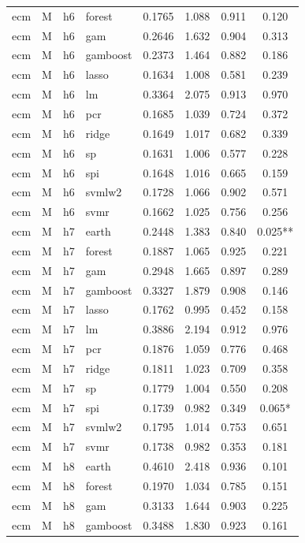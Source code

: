 \begin{ThreePartTable}
\begin{longtable}[t]{llclcccc}
ecm & M & h6 & forest & 0.1765 & 1.088 & 0.911 & 0.120\\
ecm & M & h6 & gam & 0.2646 & 1.632 & 0.904 & 0.313\\
ecm & M & h6 & gamboost & 0.2373 & 1.464 & 0.882 & 0.186\\
ecm & M & h6 & lasso & 0.1634 & 1.008 & 0.581 & 0.239\\
ecm & M & h6 & lm & 0.3364 & 2.075 & 0.913 & 0.970\\
ecm & M & h6 & pcr & 0.1685 & 1.039 & 0.724 & 0.372\\
ecm & M & h6 & ridge & 0.1649 & 1.017 & 0.682 & 0.339\\
ecm & M & h6 & sp & 0.1631 & 1.006 & 0.577 & 0.228\\
ecm & M & h6 & spi & 0.1648 & 1.016 & 0.665 & 0.159\\
ecm & M & h6 & svmlw2 & 0.1728 & 1.066 & 0.902 & 0.571\\
ecm & M & h6 & svmr & 0.1662 & 1.025 & 0.756 & 0.256\\
\addlinespace
ecm & M & h7 & earth & 0.2448 & 1.383 & 0.840 & 0.025**\\
ecm & M & h7 & forest & 0.1887 & 1.065 & 0.925 & 0.221\\
ecm & M & h7 & gam & 0.2948 & 1.665 & 0.897 & 0.289\\
ecm & M & h7 & gamboost & 0.3327 & 1.879 & 0.908 & 0.146\\
ecm & M & h7 & lasso & 0.1762 & 0.995 & 0.452 & 0.158\\
ecm & M & h7 & lm & 0.3886 & 2.194 & 0.912 & 0.976\\
ecm & M & h7 & pcr & 0.1876 & 1.059 & 0.776 & 0.468\\
ecm & M & h7 & ridge & 0.1811 & 1.023 & 0.709 & 0.358\\
ecm & M & h7 & sp & 0.1779 & 1.004 & 0.550 & 0.208\\
ecm & M & h7 & spi & 0.1739 & 0.982 & 0.349 & 0.065*\\
ecm & M & h7 & svmlw2 & 0.1795 & 1.014 & 0.753 & 0.651\\
ecm & M & h7 & svmr & 0.1738 & 0.982 & 0.353 & 0.181\\
\addlinespace
ecm & M & h8 & earth & 0.4610 & 2.418 & 0.936 & 0.101\\
ecm & M & h8 & forest & 0.1970 & 1.034 & 0.785 & 0.151\\
ecm & M & h8 & gam & 0.3133 & 1.644 & 0.903 & 0.225\\
ecm & M & h8 & gamboost & 0.3488 & 1.830 & 0.923 & 0.161\\

\end{longtable}
\end{ThreePartTable}
